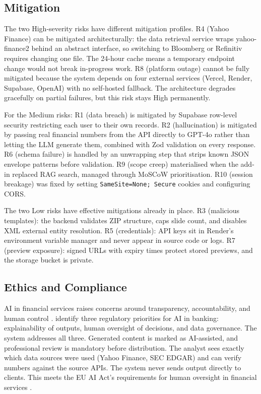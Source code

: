 \subsection{Mitigation}

The two High-severity risks have different mitigation profiles. R4 (Yahoo Finance) can be mitigated architecturally: the data retrieval service wraps yahoo-finance2 behind an abstract interface, so switching to Bloomberg or Refinitiv requires changing one file. The 24-hour cache means a temporary endpoint change would not break in-progress work. R8 (platform outage) cannot be fully mitigated because the system depends on four external services (Vercel, Render, Supabase, OpenAI) with no self-hosted fallback. The architecture degrades gracefully on partial failures, but this risk stays High permanently.

For the Medium risks: R1 (data breach) is mitigated by Supabase row-level security restricting each user to their own records. R2 (hallucination) is mitigated by passing real financial numbers from the API directly to GPT-4o rather than letting the LLM generate them, combined with Zod validation on every response. R6 (schema failure) is handled by an unwrapping step that strips known JSON envelope patterns before validation. R9 (scope creep) materialised when the add-in replaced RAG search, managed through MoSCoW prioritisation. R10 (session breakage) was fixed by setting \texttt{SameSite=None; Secure} cookies and configuring CORS.

The two Low risks have effective mitigations already in place. R3 (malicious templates): the backend validates ZIP structure, caps slide count, and disables XML external entity resolution. R5 (credentials): API keys sit in Render's environment variable manager and never appear in source code or logs. R7 (preview exposure): signed URLs with expiry times protect stored previews, and the storage bucket is private.

\subsection{Ethics and Compliance}

AI in financial services raises concerns around transparency, accountability, and human control \parencite{jobin2019}. \textcite{bis2024} identify three regulatory priorities for AI in banking: explainability of outputs, human oversight of decisions, and data governance. The system addresses all three. Generated content is marked as AI-assisted, and professional review is mandatory before distribution. The analyst sees exactly which data sources were used (Yahoo Finance, SEC EDGAR) and can verify numbers against the source APIs. The system never sends output directly to clients. This meets the EU AI Act's requirements for human oversight in financial services \parencite{bis2024}.

